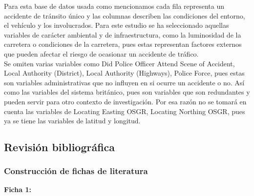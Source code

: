 \documentclass[12pt]{article}
\begin{document}
Para esta base de datos usada como mencionamos cada fila representa un accidente de tránsito único 
y las columnas describen las condiciones del entorno, el vehículo y los involucrados. 
Para este estudio se ha seleccionado aquellas variables de carácter ambiental y de infraestructura, 
como la luminosidad de la carretera o condiciones de la carretera, pues estas representan factores 
externos que pueden afectar el riesgo de ocasionar un accidente de tráfico.\\

Se omiten varias variables como Did Police Officer Attend Scene of Accident, 
Local Authority (District), Local Authority (Highways), Police Force, 
pues estas son variables administrativas que no influyen en si ocurre un accidente o no. 
Así como las variables del sistema británico, pues son variables que son redundantes y 
pueden servir para otro contexto de investigación. Por esa razón no se tomará en 
cuenta las variables de Locating Easting OSGR, Locating Northing OSGR,
pues ya se tiene las variables de latitud y longitud.\\

\subsection{Revisión bibliográfica}
\subsubsection{Construcción de fichas de literatura}
\textbf{Ficha 1:}
\end{document}
